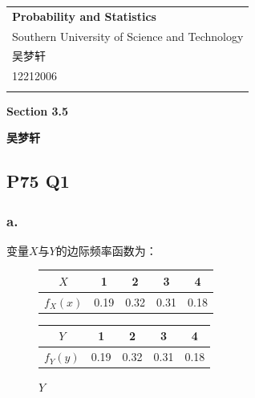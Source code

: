 \documentclass[a4paper,12pt]{ctexart}
\begin{document}
\thispagestyle{empty} %

\begin{tabular}{p{15.5cm}}
{\large \bf Probability and Statistics} \\
Southern University of Science and Technology \\ 吴梦轩 \\ 12212006 \\
\hline
\\
\end{tabular}

\vspace*{0.3cm} %

\begin{center}
	{\Large \bf Section 3.5}
	\vspace{2mm}

	{\bf 吴梦轩}
		
\end{center}  

\vspace{0.4cm}

\subsection*{P75 Q1}

\subsubsection*{a.}

变量$X$与$Y$的边际频率函数为：

\begin{figure}[H]
	\begin{minipage}{0.5\textwidth}
		\centering
		\begin{tabular}{c|cccc}
			$X$ & 1 & 2 & 3 & 4 \\
			\hline
			$f_X(x)$ & 0.19 & 0.32 & 0.31 & 0.18 \\
		\end{tabular}
		\caption*{$X$}
	\end{minipage}
	\begin{minipage}{0.5\textwidth}
		\centering
		\begin{tabular}{c|cccc}
			$Y$ & 1 & 2 & 3 & 4 \\
			\hline
			$f_Y(y)$ & 0.19 & 0.32 & 0.31 & 0.18 \\
		\end{tabular}
		\caption*{$Y$}
	\end{minipage}
\end{figure}
\end{document}
